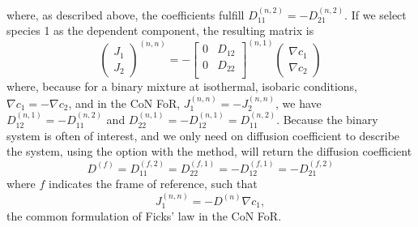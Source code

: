 where, as described above, the coefficients fulfill $D_{11}^{(n, 2)} = - D_{21}^{(n, 2)}$. If we select species 1 as the dependent component, the resulting matrix is
\begin{equation}
    \begin{pmatrix}J_1 \\ J_2\end{pmatrix}^{(n, n)} = -
    \begin{bmatrix}
    0 & D_{12} \\
    0 & D_{22} \\
    \end{bmatrix}^{(n, 1)}
    \begin{pmatrix}\nabla c_1 \\ \nabla c_2\end{pmatrix}
\end{equation}
where, because for a binary mixture at isothermal, isobaric conditions, $\nabla c_1 = - \nabla c_2$, and in the CoN FoR, $J_1^{(n, n)} = - J_2^{(n, n)}$, we have $D_{12}^{(n, 1)} = - D_{11}^{(n, 2)}$ and $D_{22}^{(n, 1)} = - D_{12}^{(n, 1)} = D_{11}^{(n, 2)}$. Because the binary system is often of interest, and we only need on diffusion coefficient to describe the system, using the option  with the  method, will return the diffusion coefficient
\begin{equation}
    D^{(f)} = D_{11}^{(f, 2)} = D_{22}^{(f, 1)} = - D_{12}^{(f, 1)} = - D_{21}^{(f, 2)}
\end{equation}
where $f$ indicates the frame of reference, such that
\begin{equation}
    J_1^{(n, n)} = - D^{(n)} \nabla c_1,
\end{equation}
the common formulation of Ficks' law in the CoN FoR.

